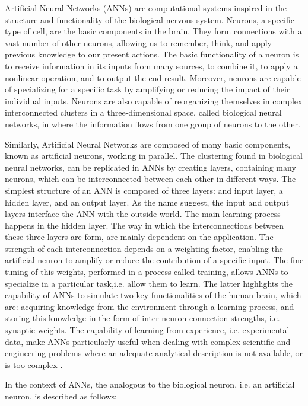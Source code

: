 Artificial Neural Networks (ANNs) are computational systems inspired in the structure and functionality of the biological nervous system. Neurons, a specific type of cell, are the basic components in the brain. They form connections with a vast number of other neurons, allowing us to remember, think, and apply previous knowledge to our present actions. The basic functionality of a neuron is to receive information in its inputs from many sources, to combine it, to apply a nonlinear operation, and to output the end result. Moreover, neurons are capable of specializing for a specific task by amplifying or reducing the impact of their individual inputs. Neurons are also capable of reorganizing themselves in complex interconnected clusters in a three-dimensional space, called biological neural networks, in where the information flows from one group of neurons to the other.

Similarly, Artificial Neural Networks are composed of many basic components, known as artificial neurons, working in parallel. The clustering found in biological neural networks, can be replicated in ANNs by creating layers, containing many neurons, which can be interconnected between each other in different ways. The simplest structure of an ANN is composed of three layers: and input layer, a hidden layer, and an output layer. As the name suggest, the input and output layers interface the ANN with the outside world. The main learning process happens in the hidden layer. The way in which the interconnections between these three layers are form, are mainly dependent on the application. The strength of each interconnection depends on a weighting factor, enabling the artificial neuron to amplify or reduce the contribution of a specific input. The fine tuning of this weights, performed in a process called training, allows ANNs to specialize in a particular task,i.e. allow them to learn. The latter highlights the capability of ANNs to simulate two key functionalities of the human brain, which are: acquiring knowledge from the environment through a learning process, and storing this knowledge in the form of inter-neuron connection strengths, i.e. synaptic weights. The capability of learning from experience, i.e. experimental data, make ANNs particularly useful when dealing with complex scientific and engineering problems where an adequate analytical description is not available, or is too complex  \cite{zhang2003artificial,trebar2007predicting}.

In the context of ANNs, the analogous to the biological neuron, i.e. an artificial neuron, is described as follows:


